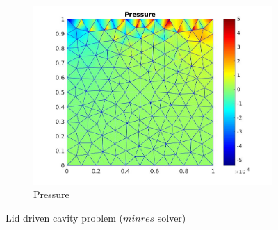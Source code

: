 \documentclass{beamer}
\begin{document}
\begin{frame}
\begin{figure}
\begin{subfigure}{0.3\textwidth}
  \includegraphics[width=\linewidth]{lid_minres_pressure.jpg}
  \caption{Pressure} 
  \label{pressure_stoke_minres_lid}
\end{subfigure}
\caption{Lid driven cavity problem ($minres$ solver)}
\label{stoke_minres_lid}
\end{figure}
\end{frame}
\end{document}
